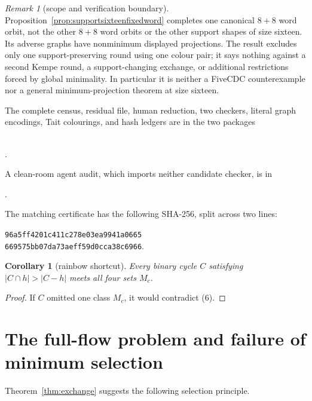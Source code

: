 \documentclass[11pt]{article}
\newtheorem{corollary}[theorem]{Corollary}
\theoremstyle{definition}
\theoremstyle{remark}
\newtheorem{remark}[theorem]{Remark}
\begin{document}
\begin{remark}[scope and verification boundary]
Proposition~\ref{prop:supportsixteenfixedword} completes one canonical
\(8+8\) word orbit, not the other \(8+8\) word orbits or the other support
shapes of size sixteen.  Its adverse graphs have nonminimum displayed
projections.  The result excludes only one support-preserving round using
one colour pair; it says nothing against a second Kempe round, a
support-changing exchange, or additional restrictions forced by global
minimality.  In particular it is neither a FiveCDC counterexample nor a
general minimum-projection theorem at size sixteen.

The complete census, residual file, human reduction, two checkers,
literal graph encodings, Tait colourings, and hash ledgers are in the two
packages
\begin{center}
\small
{}\\
.
\end{center}
A clean-room agent audit, which imports neither candidate checker, is in
\begin{center}
\small
{}.
\end{center}
The matching certificate has the following SHA-256, split across two
lines:
\begin{center}
\texttt{96a5ff4201c411c278e03ea9941a0665}\\
\texttt{669575bb07da73aeff59d0cca38c6966}.
\end{center}
\end{remark}

\begin{corollary}[rainbow shortcut]\label{cor:shortcut}
Every binary cycle \(C\) satisfying \(|C\cap h|>|C-h|\) meets all four
sets \(M_c\).
\end{corollary}

\begin{proof}
If \(C\) omitted one class \(M_c\), it would contradict (6).
\end{proof}

\section{The full-flow problem and failure of minimum selection}

Theorem~\ref{thm:exchange} suggests the following selection principle.
\end{document}
